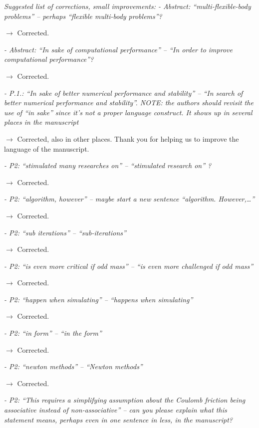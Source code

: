 \documentclass[final,12pt]{article}
\def\reviewercomment#1{{\vskip4mm \color{mycommentcolor} \textit{#1} \vskip2mm}}
\begin{document}
\reviewercomment{
Suggested list of corrections, small improvements:
- Abstract: “multi-flexible-body problems” – perhaps “flexible multi-body problems”?
}

$\rightarrow$ Corrected.

\reviewercomment{
- Abstract: “In sake of computational performance” – “In order to improve computational performance”?
}

$\rightarrow$ Corrected.

\reviewercomment{
- P.1.: “In sake of better numerical performance and stability” – “In search of better numerical performance and stability”. NOTE: the authors should revisit the use of “in sake” since it’s not a proper language construct. It shows up in several places in the manuscript
}

$\rightarrow$ Corrected, also in other places. Thank you for helping us to improve the language of the manuscript. 

\reviewercomment{
- P2: “stimulated many researches on” – “stimulated research on” ?
}

$\rightarrow$ Corrected.

\reviewercomment{
- P2: “algorithm, however” – maybe start a new sentence “algorithm. However,…”
}

$\rightarrow$ Corrected.

\reviewercomment{
- P2: “sub iterations” – “sub-iterations”
}

$\rightarrow$ Corrected.



\reviewercomment{
- P2: “is even more critical if odd mass” – “is even more challenged if odd mass”
}

$\rightarrow$ Corrected.

\reviewercomment{
- P2: “happen when simulating” – “happens when simulating”
}

$\rightarrow$ Corrected.

\reviewercomment{
- P2: “in form” – “in the form”
}

$\rightarrow$ Corrected.

\reviewercomment{
- P2: “newton methods” – “Newton methods”
}

$\rightarrow$ Corrected.

\reviewercomment{
- P2: “This requires a simplifying assumption about the Coulomb friction being associative instead of non-associative” – can you please explain what this statement means, perhaps even in one sentence in less, in the manuscript?
}
\end{document}
